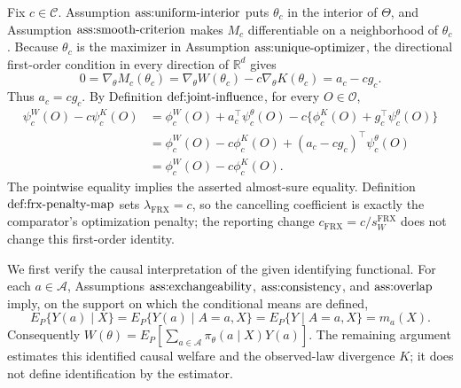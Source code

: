 Fix \(c\in\mathcal C\).  Assumption \(\textnormal{ass:uniform-interior}\) puts \(\theta_c\) in the interior of \(\Theta\), and Assumption \(\textnormal{ass:smooth-criterion}\) makes \(M_c\) differentiable on a neighborhood of \(\theta_c\).  Because \(\theta_c\) is the maximizer in Assumption \(\textnormal{ass:unique-optimizer}\), the directional first-order condition in every direction of \(\mathbb R^d\) gives
\[
 0=\nabla_\theta M_c(\theta_c)
  =\nabla_\theta W(\theta_c)-c\nabla_\theta K(\theta_c)
  =a_c-cg_c.
\]
Thus \(a_c=cg_c\).  By Definition \(\textnormal{def:joint-influence}\), for every \(O\in\mathcal O\),
\[
\begin{aligned}
 \psi_c^W(O)-c\psi_c^K(O)
 &=\phi_c^W(O)+a_c^\top\psi_c^\theta(O)
   -c\{\phi_c^K(O)+g_c^\top\psi_c^\theta(O)\}\\
 &=\phi_c^W(O)-c\phi_c^K(O)
   +(a_c-cg_c)^\top\psi_c^\theta(O)\\
 &=\phi_c^W(O)-c\phi_c^K(O).
\end{aligned}
\]
The pointwise equality implies the asserted almost-sure equality.  Definition \(\textnormal{def:frx-penalty-map}\) sets \(\lambda_{\mathrm{FRX}}=c\), so the cancelling coefficient is exactly the comparator's optimization penalty; the reporting change \(c_{\mathrm{FRX}}=c/s_W^{\mathrm{FRX}}\) does not change this first-order identity.

We first verify the causal interpretation of the given identifying functional.  For each \(a\in\mathcal A\), Assumptions \(\textnormal{ass:exchangeability}\), \(\textnormal{ass:consistency}\), and \(\textnormal{ass:overlap}\) imply, on the support on which the conditional means are defined,
\[
 E_P\{Y(a)\mid X\}
 =E_P\{Y(a)\mid A=a,X\}
 =E_P\{Y\mid A=a,X\}=m_a(X).
\]
Consequently \(W(\theta)=E_P[\sum_{a\in\mathcal A}\pi_\theta(a\mid X)Y(a)]\).  The remaining argument estimates this identified causal welfare and the observed-law divergence \(K\); it does not define identification by the estimator.

